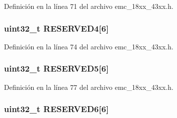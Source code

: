 Definición en la línea 71 del archivo emc\+\_\+18xx\+\_\+43xx.\+h.

\subsubsection[{\texorpdfstring{R\+E\+S\+E\+R\+V\+E\+D4}{RESERVED4}}]{ uint32\+\_\+t R\+E\+S\+E\+R\+V\+E\+D4\mbox{[}6\mbox{]}}\hypertarget{struct_l_p_c___e_m_c___t_a5be6ee872a56ca3d4796d6bb287ec307}{}\label{struct_l_p_c___e_m_c___t_a5be6ee872a56ca3d4796d6bb287ec307}


Definición en la línea 74 del archivo emc\+\_\+18xx\+\_\+43xx.\+h.

\subsubsection[{\texorpdfstring{R\+E\+S\+E\+R\+V\+E\+D5}{RESERVED5}}]{ uint32\+\_\+t R\+E\+S\+E\+R\+V\+E\+D5\mbox{[}6\mbox{]}}\hypertarget{struct_l_p_c___e_m_c___t_a0b685e50644e53d4b7c6fa9ed6c93fc8}{}\label{struct_l_p_c___e_m_c___t_a0b685e50644e53d4b7c6fa9ed6c93fc8}


Definición en la línea 77 del archivo emc\+\_\+18xx\+\_\+43xx.\+h.

\subsubsection[{\texorpdfstring{R\+E\+S\+E\+R\+V\+E\+D6}{RESERVED6}}]{ uint32\+\_\+t R\+E\+S\+E\+R\+V\+E\+D6\mbox{[}6\mbox{]}}\hypertarget{struct_l_p_c___e_m_c___t_a656b237e614b6d241574604849d86b8b}{}\label{struct_l_p_c___e_m_c___t_a656b237e614b6d241574604849d86b8b}


